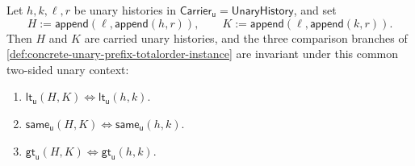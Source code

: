 \begin{theorem}
\label{thm:totalorder-branch-two-sided-context-equivalence}
Let $h,k,\ell,r$ be unary histories in
$\mathsf{Carrier}_{\mathsf{u}}=\mathsf{UnaryHistory}$, and set
$$
H:=\mathsf{append}(\ell,\mathsf{append}(h,r)),
\qquad
K:=\mathsf{append}(\ell,\mathsf{append}(k,r)).
$$
Then $H$ and $K$ are carried unary histories, and the three comparison branches
of \autoref{def:concrete-unary-prefix-totalorder-instance} are invariant under
this common two-sided unary context:
\begin{enumerate}
  \item $\mathsf{lt}_{\mathsf{u}}(H,K)\Longleftrightarrow
  \mathsf{lt}_{\mathsf{u}}(h,k)$.
  \item $\mathsf{same}_{\mathsf{u}}(H,K)\Longleftrightarrow
  \mathsf{same}_{\mathsf{u}}(h,k)$.
  \item $\mathsf{gt}_{\mathsf{u}}(H,K)\Longleftrightarrow
  \mathsf{gt}_{\mathsf{u}}(h,k)$.
\end{enumerate}
\end{theorem}
